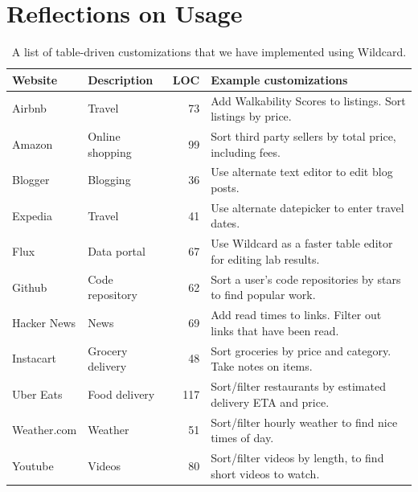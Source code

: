 \documentclass[sigplan,screen,10pt,anonymous,review]{acmart}
\begin{document}
\hypertarget{sec:reflections}{%
\section{Reflections on Usage}\label{sec:reflections}}

\begin{table}[]
\begin{tabular}{llrl}
\hline
\textbf{Website} & \textbf{Description} & \textbf{LOC} & \textbf{Example customizations}                                                              \\ \hline
Airbnb           & Travel               & 73                                       & Add Walkability Scores to listings. Sort listings by price.                           \\
Amazon           & Online shopping      & 99                                       & Sort third party sellers by total price, including fees.                                \\
Blogger          & Blogging             & 36                                       & Use alternate text editor to edit blog posts.                                                 \\
Expedia          & Travel               & 41                                       & Use alternate datepicker to enter travel dates.                                               \\
Flux             & Data portal          & 67                                       & Use Wildcard as a faster table editor for editing lab results.                                \\
Github           & Code repository      & 62                                       & Sort a user's code repositories by stars to find popular work.                                \\
Hacker News      & News                 & 69                                       & Add read times to links. Filter out links that have been read. \\
Instacart        & Grocery delivery     & 48                                       & Sort groceries by price and category. Take notes on items.                                   \\
Uber Eats        & Food delivery        & 117                                      & Sort/filter restaurants by estimated delivery ETA and price.                                 \\
Weather.com  & Weather              & 51                                       & Sort/filter hourly weather to find nice times of day.                                        \\
Youtube          & Videos               & 80                                       & Sort/filter videos by length, to find short videos to watch.                                 \\ \hline
\end{tabular}
\caption{A list of table-driven customizations that we have implemented using Wildcard.}
\label{tab:websites}
\end{table}
\end{document}
